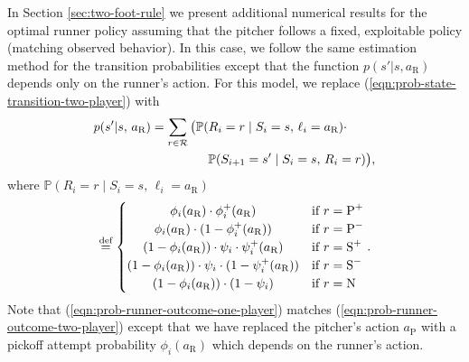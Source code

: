 \documentclass[opre,dblanonrev]{informs4}
\newcommand{\defeq}{\stackrel{\text{def}}{=}}
\begin{document}
      In Section \ref{sec:two-foot-rule} we present additional numerical results for the optimal runner policy assuming that the pitcher follows a fixed, exploitable policy (matching observed behavior). In this case, we follow the same estimation method for the transition probabilities except that the function $p(s'|s,a_\text{R})$ depends only on the runner's action. For this model, we replace (\ref{eqn:prob-state-transition-two-player}) with
      \begin{align}
        \label{eqn:prob-state-transition-one-player}
        \begin{split}
          &p(s'|s,\, a_\text{R}) = \sum_{r \in \mathcal{R}} \big(\mathbb{P}(R_i = r \mid S_i = s,\, \ell_i = a_\text{R}) \cdot \\
          & \hspace{32mm} \mathbb{P}(S_{i+1} = s' \mid S_i = s,\, R_i = r)\big),
        \end{split}
      \end{align}
      where $\mathbb{P}(R_i = r \mid S_i = s,\, \ell_i = a_\text{R})$ 
      \begin{align}
        \label{eqn:prob-runner-outcome-one-player}
        \begin{split}
        \defeq 
          \begin{cases}
              \hfil \phi_i(a_\text{R}) \cdot \phi_i^+(a_\text{R})                             & \mbox{if } r = \mbox{P}^+\\
              \hfil \phi_i(a_\text{R}) \cdot (1 - \phi_i^+(a_\text{R}))                       & \mbox{if } r = \mbox{P}^-\\
              \hfil (1 - \phi_i(a_\text{R})) \cdot \psi_i \cdot \psi_i^+(a_\text{R})         & \mbox{if } r = \mbox{S}^+\\
              \hfil (1 - \phi_i(a_\text{R})) \cdot \psi_i \cdot (1 - \psi_i^+(a_\text{R}))   & \mbox{if } r = \mbox{S}^-\\
              \hfil (1 - \phi_i(a_\text{R})) \cdot (1 - \psi_i)                              & \mbox{if } r = \mbox{N}\\
          \end{cases}.
        \end{split}
      \end{align}
      Note that (\ref{eqn:prob-runner-outcome-one-player}) matches (\ref{eqn:prob-runner-outcome-two-player}) except that we have replaced the pitcher's action $a_\text{P}$ with a pickoff attempt probability $\phi_i(a_\text{R})$ which depends on the runner's action.
      
\end{document}

